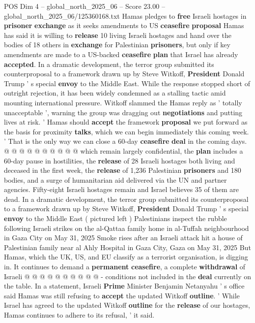 \begin{textsample}{POS Dim 4 – global\_north\_2025\_06 – Score 23.00 – global\_north\_2025\_06/125360168.txt}  \label{ex:f4_pos_392}
Hamas pledges to \textbf{free} Israeli hostages in \textbf{prisoner} \textbf{exchange} as it seeks amendments to US \textbf{ceasefire} \textbf{proposal} Hamas has said it is willing to \textbf{release} 10 living Israeli hostages and hand over the bodies of 18 others in \textbf{exchange} for Palestinian \textbf{prisoners}, but only if key amendments are made to a US-backed \textbf{ceasefire} \textbf{plan} that Israel has already \textbf{accepted}.
In a dramatic development, the terror group submitted its counterproposal to a framework drawn up by Steve Witkoff, \textbf{President} Donald Trump ' s special \textbf{envoy} to the Middle East.
While the response stopped short of outright rejection, it has been widely condemned as a stalling tactic amid mounting international pressure.
Witkoff slammed the Hamas reply as ' totally unacceptable ', warning the group was dragging out \textbf{negotiations} and putting lives at risk. ' Hamas should \textbf{accept} the framework \textbf{proposal} we put forward as the basis for proximity \textbf{talks}, which we can begin immediately this coming week. ' That is the only way we can close a 60-day \textbf{ceasefire} \textbf{deal} in the coming days. @ @ @ @ @ @ @ @ @ @ which remain largely confidential, the \textbf{plan} includes a 60-day pause in hostilities, the \textbf{release} of 28 Israeli hostages both living and deceased in the first week, the \textbf{release} of 1,236 Palestinian \textbf{prisoners} and 180 bodies, and a surge of humanitarian aid delivered via the UN and partner agencies.
Fifty-eight Israeli hostages remain and Israel believes 35 of them are dead.
In a dramatic development, the terror group submitted its counterproposal to a framework drawn up by Steve Witkoff, \textbf{President} Donald Trump ' s special \textbf{envoy} to the Middle East ( pictured left ) Palestinians inspect the rubble following Israeli strikes on the al-Qattaa family home in al-Tuffah neighbourhood in Gaza City on May 31, 2025 Smoke rises after an Israeli attack hit a house of Palestinian family near al Ahly Hospital in Gaza City, Gaza on May 31, 2025 But Hamas, which the UK, US, and EU classify as a terrorist organisation, is digging in.
It continues to demand a \textbf{permanent} \textbf{ceasefire}, a complete \textbf{withdrawal} of Israeli @ @ @ @ @ @ @ @ @ @ - conditions not included in the \textbf{deal} currently on the table.
In a statement, Israeli \textbf{Prime} Minister Benjamin Netanyahu ' s office said Hamas was still refusing to \textbf{accept} the updated Witkoff \textbf{outline}. ' While Israel has agreed to the updated Witkoff \textbf{outline} for the \textbf{release} of our hostages, Hamas continues to adhere to its refusal, ' it said.

\end{textsample}
